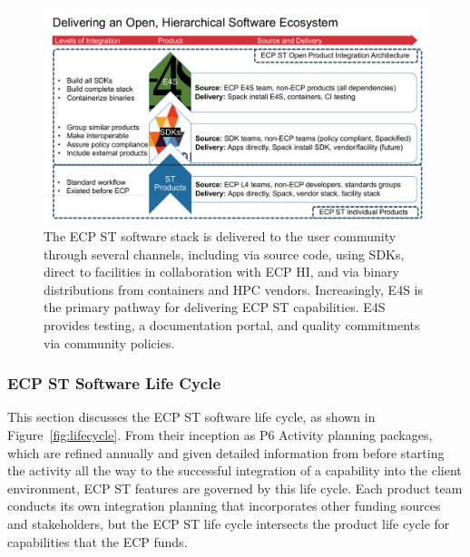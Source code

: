 \begin{figure}
	\centering
	\includegraphics[width=0.9\linewidth]{E4S-Hierarchy}
	\caption{The ECP ST software stack is delivered to the user community through several channels, including via source code, using SDKs, direct to facilities in collaboration with ECP HI, and via binary distributions from containers and HPC vendors.
	Increasingly, E4S is the primary pathway for delivering ECP ST capabilities.  E4S provides testing, a documentation portal, and quality commitments via community policies.}
	\label{fig:hierarchy}
    \protect{}
    \protect{}
\end{figure}

\subsubsection{ECP ST Software Life Cycle}
This section discusses the ECP ST software life cycle, as shown in Figure~\ref{fig:lifecycle}.  From their inception as P6 Activity planning packages, which are refined annually and given detailed information from before starting the activity all the way to the successful integration of a capability into the client environment, ECP ST features are governed by this life cycle.  Each product team conducts its own integration planning that incorporates other funding sources and stakeholders, but the ECP ST life cycle intersects the product life cycle for capabilities that the ECP funds.

